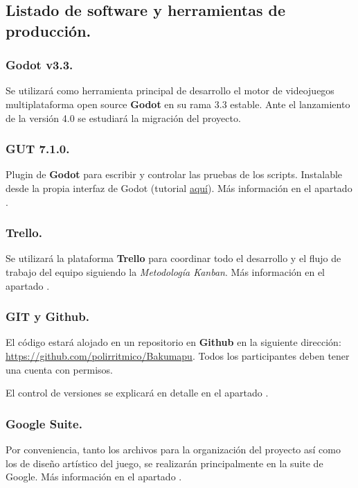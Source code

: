 \subsection{Listado de software y herramientas de producción.}\label{intro:software-y-herramientas}

\subsubsection{Godot v3.3.}
Se utilizará como herramienta principal de desarrollo el motor de videojuegos multiplataforma open source \textbf{Godot} en su rama 3.3 estable. Ante el lanzamiento de la versión 4.0 se estudiará la migración del proyecto.

\subsubsection*{\small GUT 7.1.0.}
Plugin de \textbf{Godot} para escribir y controlar las pruebas de los scripts. Instalable desde la propia interfaz de Godot (tutorial \href{https://www.youtube.com/watch?v=5DrhMiuLRl0}{aquí}). Más información en el apartado .

\subsubsection{Trello.}
Se utilizará la plataforma \textbf{Trello} para coordinar todo el desarrollo y el flujo de trabajo del equipo siguiendo la \emph{Metodología Kanban}. Más información en el apartado .

\subsubsection{GIT y Github.}
El código estará alojado en un repositorio  en \textbf{Github} en la siguiente dirección: \url{https://github.com/polirritmico/Bakumapu}. Todos los participantes deben tener una cuenta con permisos.

El control de versiones se explicará en detalle en el apartado .

\subsubsection{Google Suite.}
Por conveniencia, tanto los archivos para la organización del proyecto así como los de diseño artístico del juego, se realizarán principalmente en la suite de Google. Más información en el apartado .


